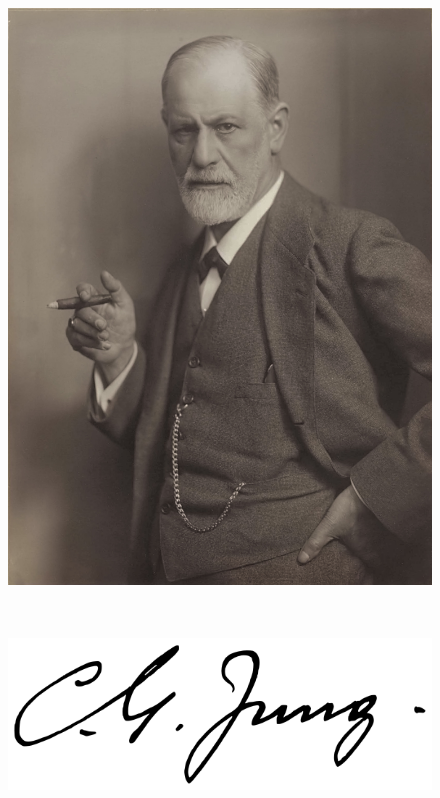 \documentclass[letterpaper]{article}
\begin{document}
\begin{figure}
\begin{minipage}{0.45\textwidth}
	\end{minipage}\textwidth\begin{minipage}{0.45\textwidth}\centering
	\includegraphics[width=1.0\textwidth]{Sigmund_Freud.jpg}
	\end{minipage}\\
	\noindent\begin{minipage}{0.45\textwidth}\centering
	\includegraphics[width=1.0\textwidth]{585px-Carl_Jung_signature.png}
	\end{minipage}\textwidth\begin{minipage}{0.45\textwidth}\centering

\end{minipage}
\end{figure}
\end{document}
